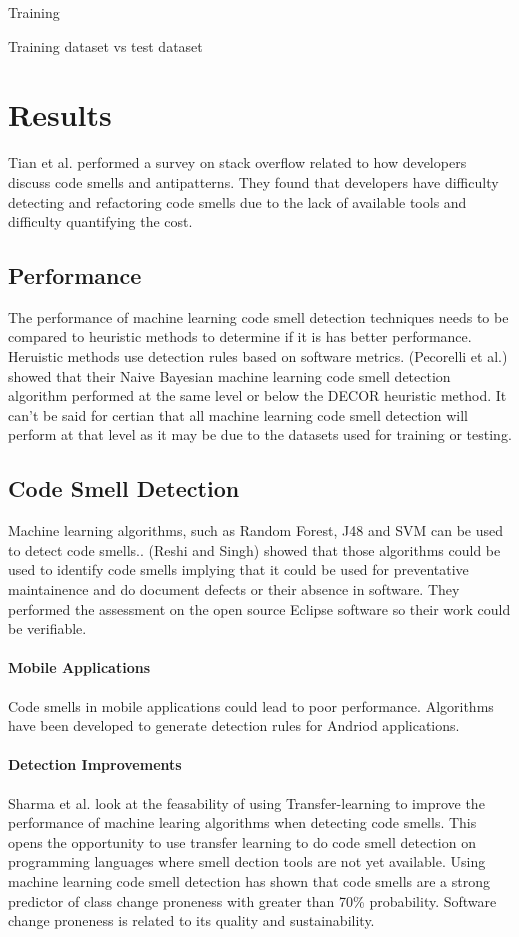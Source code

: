 \documentclass[conference]{IEEEtran}
\begin{document}
Training

Training dataset vs test dataset

\section{Results}
Tian et al.\cite{tian_how_2019} performed a survey on stack overflow related to how developers discuss code smells and antipatterns. They found that developers have difficulty detecting and refactoring code smells due to the lack of available tools and difficulty quantifying the cost.
\subsection{Performance}
The performance of machine learning code smell detection techniques needs to be compared to heuristic methods to determine if it is has better performance. Heruistic methods use detection rules based on software metrics. (Pecorelli et al.) showed\cite{pecorelli_comparing_2019} that their Naive Bayesian machine learning code smell detection algorithm performed at the same level or below the DECOR heuristic method. 
It can't be said for certian that all machine learning code smell detection will perform at that level as it may be due to the datasets used for training or testing.
\subsection{Code Smell Detection}
Machine learning algorithms, such as Random Forest, J48 and SVM can be used to detect code smells.\cite{reshi_investigating_2019}. (Reshi and Singh) showed that those algorithms could be used to identify code smells implying that it could be used for preventative maintainence and do document defects or their absence in software. They performed the assessment on the open source Eclipse software so their work could be verifiable.
\paragraph{Mobile Applications}
Code smells in mobile applications could lead to poor performance. Algorithms have been developed\cite{rubin_sniffing_2019} to generate detection rules for Andriod applications.
\paragraph{Detection Improvements}
Sharma et al.\cite{sharma_feasibility_2019} look at the feasability of using Transfer-learning to improve the performance of machine learing algorithms when detecting code smells. This opens the opportunity to use transfer learning to do code smell detection on programming languages where smell dection tools are not yet available.
Using machine learning code smell detection has shown that code smells are a strong predictor of class change proneness\cite{pritam_assessment_2019} with greater than 70\% probability. Software change proneness is related to its quality and sustainability.
\end{document}
